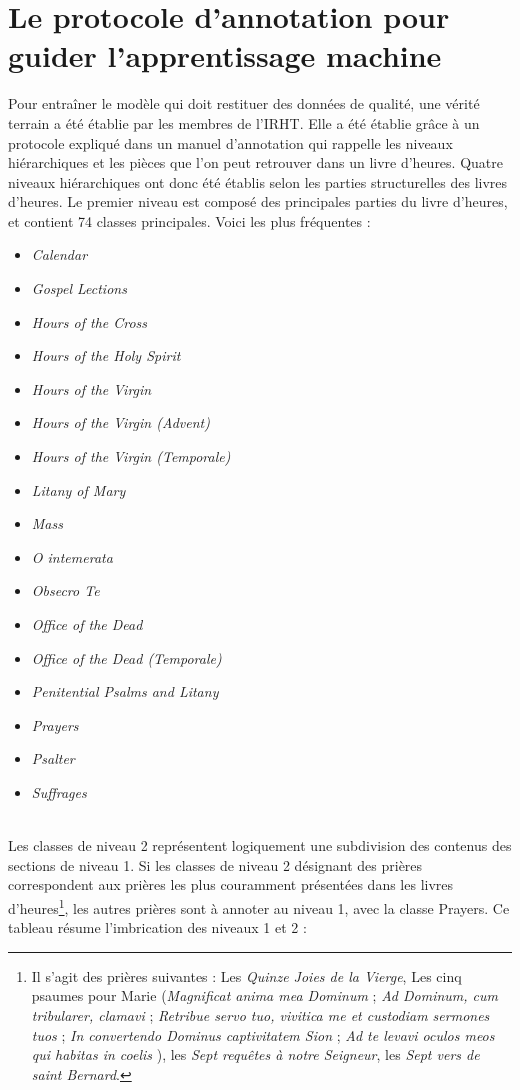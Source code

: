 \documentclass[a4paper,12pt,twoside]{book}
\begin{document}
	\section{\label{protocole_annotation}Le protocole d’annotation pour guider l’apprentissage machine}
	
	Pour entraîner le modèle qui doit restituer des données de qualité, une vérité terrain a été établie par les membres de l'IRHT. Elle a été établie grâce à un protocole expliqué dans un manuel d'annotation qui rappelle les niveaux hiérarchiques et les pièces que l'on peut retrouver dans un livre d'heures. Quatre niveaux hiérarchiques ont donc été établis selon les parties structurelles des livres d'heures. Le premier niveau est composé des principales parties du livre d'heures, et contient 74 classes principales. Voici les plus fréquentes :
	\begin{itemize}
	    \item \textit{Calendar}
        \item \textit{Gospel Lections}
        \item \textit{Hours of the Cross}
        \item \textit{Hours of the Holy Spirit}
        \item \textit{Hours of the Virgin}
        \item \textit{Hours of the Virgin (Advent)}
        \item \textit{Hours of the Virgin (Temporale)}
        \item \textit{Litany of Mary}
        \item \textit{Mass}
        \item \textit{O intemerata}
        \item \textit{Obsecro Te}
        \item \textit{Office of the Dead}
        \item \textit{Office of the Dead (Temporale)}
        \item \textit{Penitential Psalms and Litany}
        \item \textit{Prayers}
        \item \textit{Psalter}
        \item \textit{Suffrages}
	\end{itemize} 
	\\
	
	
	Les classes de niveau 2 représentent logiquement une subdivision des contenus des sections de niveau 1. Si les classes de niveau 2 désignant des prières correspondent aux prières les plus couramment présentées dans les livres d’heures\footnote{Il s'agit des prières suivantes : Les \textit{Quinze Joies de la Vierge}, Les cinq psaumes pour Marie (\og \textit{Magnificat anima mea Dominum }\fg{} ; \of \textit{Ad Dominum, cum tribularer, clamavi}\fg{} ; \og \textit{Retribue servo tuo, vivitica me et custodiam sermones tuos }\fg{} ; \og \textit{In convertendo Dominus captivitatem Sion }\fg{} ; \og \textit{Ad te levavi oculos meos qui habitas in coelis }\fg{}), les \textit{Sept requêtes à notre Seigneur}, les \textit{Sept vers de saint Bernard}.}, les autres prières sont à annoter au niveau 1, avec la classe \og Prayers\fg{}. Ce tableau résume l'imbrication des niveaux 1 et 2 : 
\end{document}
